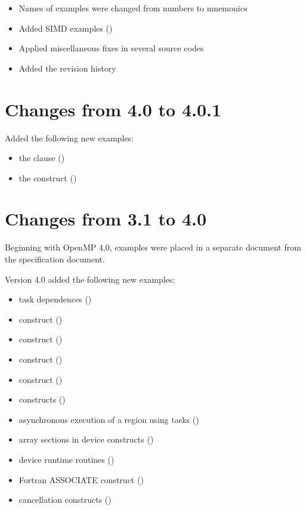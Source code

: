 \begin{itemize}
\item Names of examples were changed from numbers to mnemonics
\item Added SIMD examples ()
\item Applied miscellaneous fixes in several source codes
\item Added the revision history
\end{itemize}

\section{Changes from 4.0 to 4.0.1}

Added the following new examples:
\begin{itemize}
\item the  clause ()
\item the  construct ()
\end{itemize}

\section{Changes from 3.1 to 4.0}

Beginning with OpenMP 4.0, examples were placed in a separate document
from the specification document.

Version 4.0 added the following new examples:
\begin{itemize}
\item task dependences ()
\item {} construct ()
\item {}  construct ()
\item {}  construct ()
\item {}  construct ()
\item {} constructs ()
\item asynchronous execution of a  region using tasks
 ()
\item array sections in device constructs ()
\item device runtime routines ()
\item Fortran ASSOCIATE construct ()
\item cancellation constructs ()
\end{itemize}
